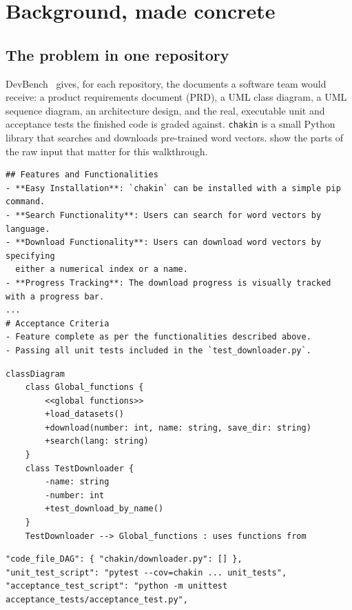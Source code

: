 \documentclass[10pt,a4paper]{article}
\newcommand{\file}[1]{\texttt{#1}}
\theoremstyle{definition}
\begin{document}
\section{Background, made concrete}\label{sec:background}

\subsection{The problem in one repository}

DevBench~\cite{li2024devbench} gives, for each repository, the documents a
software team would receive: a product requirements document (PRD), a UML
class diagram, a UML sequence diagram, an architecture design, and the real,
executable unit and acceptance tests the finished code is graded against.
\texttt{chakin} is a small Python library that searches and downloads
pre-trained word vectors.  show the parts of
the raw input that matter for this walkthrough.

\begin{lstlisting}[style=raw, caption={Raw input 1: excerpt of \file{chakin/PRD.md}.}, label={lst:prd}]
## Features and Functionalities
- **Easy Installation**: `chakin` can be installed with a simple pip command.
- **Search Functionality**: Users can search for word vectors by language.
- **Download Functionality**: Users can download word vectors by specifying
  either a numerical index or a name.
- **Progress Tracking**: The download progress is visually tracked with a progress bar.
...
# Acceptance Criteria
- Feature complete as per the functionalities described above.
- Passing all unit tests included in the `test_downloader.py`.
\end{lstlisting}

\begin{lstlisting}[style=raw, caption={Raw input 2: \file{chakin/UML_class.md} (mermaid).}, label={lst:uml}]
classDiagram
    class Global_functions {
        <<global functions>>
        +load_datasets()
        +download(number: int, name: string, save_dir: string)
        +search(lang: string)
    }
    class TestDownloader {
        -name: string
        -number: int
        +test_download_by_name()
    }
    TestDownloader --> Global_functions : uses functions from
\end{lstlisting}

\begin{lstlisting}[style=raw, caption={Raw input 3: excerpt of \file{chakin/repo_config.json}.}, label={lst:cfg}]
"code_file_DAG": { "chakin/downloader.py": [] },
"unit_test_script": "pytest --cov=chakin ... unit_tests",
"acceptance_test_script": "python -m unittest acceptance_tests/acceptance_test.py",
\end{lstlisting}
\end{document}

